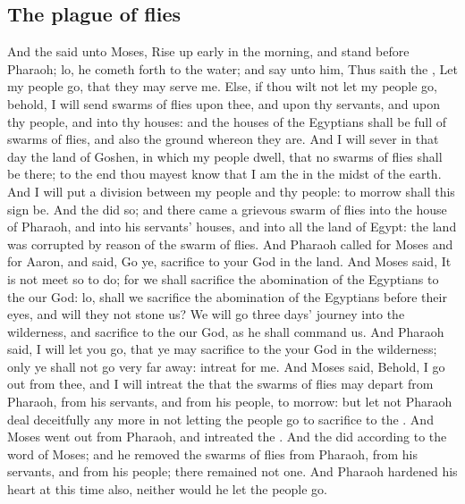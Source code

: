 \begin{biblechapter}
\section*{The plague of flies}
\verse And the \LORD said unto Moses, Rise up early in the morning, and stand before Pharaoh; lo, he cometh forth to the water; and say unto him, Thus saith the \LORD, Let my people go, that they may serve me.
\verse Else, if thou wilt not let my people go, behold, I will send swarms of flies upon thee, and upon thy servants, and upon thy people, and into thy houses: and the houses of the Egyptians shall be full of swarms of flies, and also the ground whereon they are.
\verse And I will sever in that day the land of Goshen, in which my people dwell, that no swarms of flies shall be there; to the end thou mayest know that I am the \LORD in the midst of the earth.
\verse And I will put a division between my people and thy people: to morrow shall this sign be.
\verse And the \LORD did so; and there came a grievous swarm of flies into the house of Pharaoh, and into his servants' houses, and into all the land of Egypt: the land was corrupted by reason of the swarm of flies.
\verse And Pharaoh called for Moses and for Aaron, and said, Go ye, sacrifice to your God in the land.
\verse And Moses said, It is not meet so to do; for we shall sacrifice the abomination of the Egyptians to the \LORD our God: lo, shall we sacrifice the abomination of the Egyptians before their eyes, and will they not stone us?
\verse We will go three days' journey into the wilderness, and sacrifice to the \LORD our God, as he shall command us.
\verse And Pharaoh said, I will let you go, that ye may sacrifice to the \LORD your God in the wilderness; only ye shall not go very far away: intreat for me.
\verse And Moses said, Behold, I go out from thee, and I will intreat the \LORD that the swarms of flies may depart from Pharaoh, from his servants, and from his people, to morrow: but let not Pharaoh deal deceitfully any more in not letting the people go to sacrifice to the \LORD.
\verse And Moses went out from Pharaoh, and intreated the \LORD.
\verse And the \LORD did according to the word of Moses; and he removed the swarms of flies from Pharaoh, from his servants, and from his people; there remained not one.
\verse And Pharaoh hardened his heart at this time also, neither would he let the people go.
\end{biblechapter}


